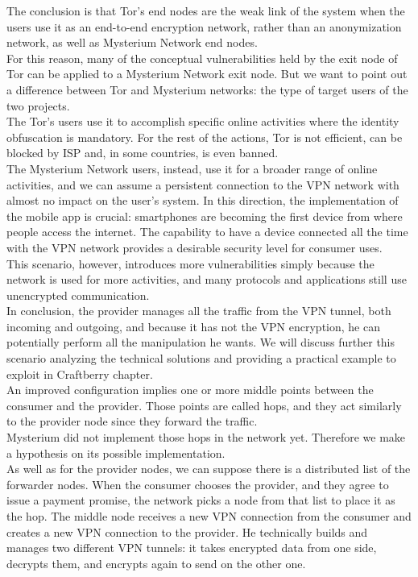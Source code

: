 \documentclass[12pt]{article}
\begin{document}
	The conclusion is that Tor's end nodes are the weak link of the system when the users use it as an end-to-end encryption network, rather than an anonymization network, as well as Mysterium Network end nodes.\\
	For this reason, many of the conceptual vulnerabilities held by the exit node of Tor can be applied to a Mysterium Network exit node. But we want to point out a difference between Tor and Mysterium networks: the type of target users of the two projects.\\
	The Tor's users use it to accomplish specific online activities where the identity obfuscation is mandatory. For the rest of the actions, Tor is not efficient, can be blocked by ISP and, in some countries, is even banned.\\
	The Mysterium Network users, instead, use it for a broader range of online activities, and we can assume a persistent connection to the VPN network with almost no impact on the user's system. In this direction, the implementation of the mobile app is crucial: smartphones are becoming the first device from where people access the internet. The capability to have a device connected all the time with the VPN network provides a desirable security level for consumer uses.\\
	This scenario, however, introduces more vulnerabilities simply because the network is used for more activities, and many protocols and applications still use unencrypted communication.\\
	In conclusion, the provider manages all the traffic from the VPN tunnel, both incoming and outgoing, and because it has not the VPN encryption, he can potentially perform all the manipulation he wants. We will discuss further this scenario analyzing the technical solutions and providing a practical example to exploit in Craftberry chapter.\\
	\bigbreak
	An improved configuration implies one or more middle points between the consumer and the provider. Those points are called hops, and they act similarly to the provider node since they forward the traffic.\\
	Mysterium did not implement those hops in the network yet. Therefore we make a hypothesis on its possible implementation.\\
	As well as for the provider nodes, we can suppose there is a distributed list of the forwarder nodes. When the consumer chooses the provider, and they agree to issue a payment promise, the network picks a node from that list to place it as the hop. The middle node receives a new VPN connection from the consumer and creates a new VPN connection to the provider. He technically builds and manages two different VPN tunnels: it takes encrypted data from one side, decrypts them, and encrypts again to send on the other one.\\
\end{document}
